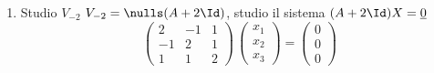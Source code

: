 {\begin{enumerate}
    Calcolo $ e_2 $\begin{gather*}
        v_2 \cdot e_1 =\frac{1}{\sqrt{2}}\\
        v_2-(v_2 \cdot e_1)\,e_1 = \begin{pmatrix}
            0\\1\\1
        \end{pmatrix}-\frac{1}{2}\begin{pmatrix}
            1\\0\\1
        \end{pmatrix}=\begin{pmatrix}
            -1/2\\1\\1/2
        \end{pmatrix}=\frac{1}{2}\begin{pmatrix}
            -1\\2\\1
        \end{pmatrix}\\
        ||v_2-(v_2 \cdot e_1)\,e_1|| = \frac{1}{2}\sqrt{1+5+1}=\frac{\sqrt{6}}{2}
    \end{gather*} 

    $ \implies $ $ e_2=\frac{1}{\sqrt{6}}\biggl(\begin{smallmatrix}
        -1 \\ 2 \\ 1
    \end{smallmatrix}\biggr) $ 

    $ \implies $ $ \{e_1, e_2\} $ base ortonormale di $ V_1 $

    \item Studio $ V_{-2} $ $ V_{-2} =\nulls (A+2\Id)$, studio il sistema $ (A+2\Id)X=\underline{0} $ \[
        \begin{pmatrix}
            2 & -1 & 1 \\
            -1 & 2 & 1\\
            1 & 1 & 2
        \end{pmatrix}\,\begin{pmatrix}
            x_1\\x_2\\x_3
        \end{pmatrix}=\begin{pmatrix}
            0\\0\\0
        \end{pmatrix}
    \]


\end{enumerate}}
